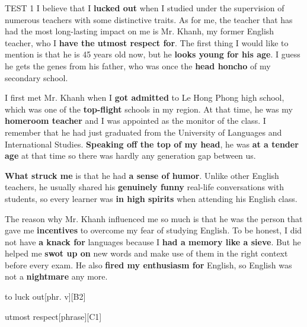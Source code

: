 \documentclass[a4paper,12pt]{article}
\begin{document}
\begin{glossarymc}[Cambridge 3]
\begin{test}{TEST 1}
I believe that I \textbf{lucked out} when I studied under the supervision of numerous teachers with some distinctive traits. 
As for me, the teacher that has had the most long-lasting impact on me is Mr. Khanh, my former English teacher, who I \textbf{have the utmost respect for}. 
The first thing I would like to mention is that he is 45 years old now, but he \textbf{looks young for his age}. 
I guess he gets the genes from his father, who was once the \textbf{head honcho} of my secondary school.  

I first met Mr. Khanh when I \textbf{got admitted} to Le Hong Phong high school, which was one of the \textbf{top-flight} schools in my region. 
At that time, he was my \textbf{homeroom teacher} and I was appointed as the monitor of the class. 
I remember that he had just graduated from the University of Languages and International Studies. 
\textbf{Speaking off the top of my head}, he was \textbf{at a tender age} at that time so there was hardly any generation gap between us.  

\textbf{What struck me} is that he had \textbf{a sense of humor}. 
Unlike other English teachers, he usually shared his \textbf{genuinely funny} real-life conversations with students, so every learner was \textbf{in high spirits} when attending his English class.  

The reason why Mr. Khanh influenced me so much is that he was the person that gave me \textbf{incentives} to overcome my fear of studying English. 
To be honest, I did not have \textbf{a knack for} languages because I \textbf{had a memory like a sieve}. 
But he helped me \textbf{swot up on} new words and make use of them in the right context before every exam. 
He also \textbf{fired my enthusiasm for} English, so English was not a \textbf{nightmare} any more.


\begin{VocabExplain}[Part 2]
    \begin{ExplainCard}{to luck out}[phr. v][B2]
\end{ExplainCard}

\begin{ExplainCard}{utmost respect}[phrase][C1]
\end{ExplainCard}


\end{VocabExplain}
\end{test}
\end{glossarymc}
\end{document}
